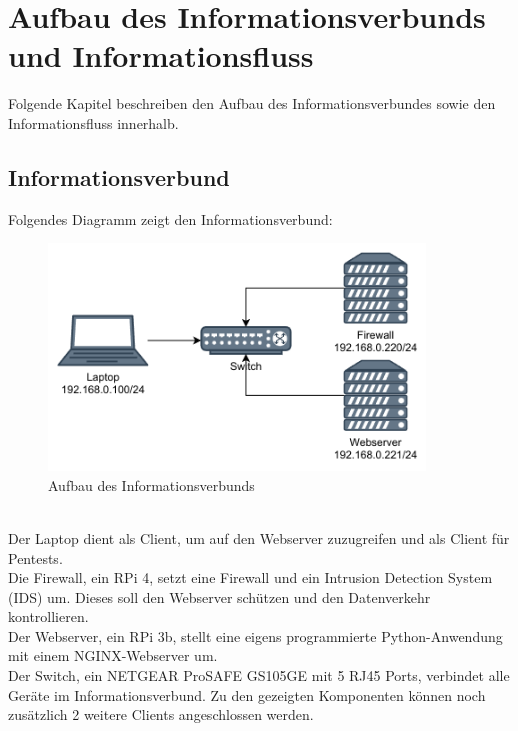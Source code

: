 \documentclass[
    a4paper,
    pagesize,
	pdftex,
    12pt,
]{scrartcl}
\begin{document}
\newpage
\section{Aufbau des Informationsverbunds und Informationsfluss}
Folgende Kapitel beschreiben den Aufbau des Informationsverbundes  sowie den Informationsfluss innerhalb.

\subsection{Informationsverbund}
Folgendes Diagramm zeigt den Informationsverbund:
\begin{figure}[!ht]
	\centering
	\includegraphics[width=10cm]{aufbau.png}
	\caption{Aufbau des Informationsverbunds}
	\label{fig:boat1}
\end{figure}
\\
Der Laptop dient als Client, um auf den Webserver zuzugreifen und als Client für  Pentests. \\
Die Firewall, ein RPi 4, setzt eine Firewall und ein  Intrusion Detection System (IDS) um. Dieses soll den Webserver schützen und den Datenverkehr  kontrollieren. \\
Der Webserver, ein RPi 3b, stellt eine eigens programmierte Python-Anwendung mit einem NGINX-Webserver um. \\
Der Switch, ein  NETGEAR ProSAFE GS105GE mit 5 RJ45 Ports, verbindet alle Geräte im Informationsverbund.  Zu den  gezeigten Komponenten können noch zusätzlich  2 weitere  Clients  angeschlossen werden.

\newpage
\end{document}
